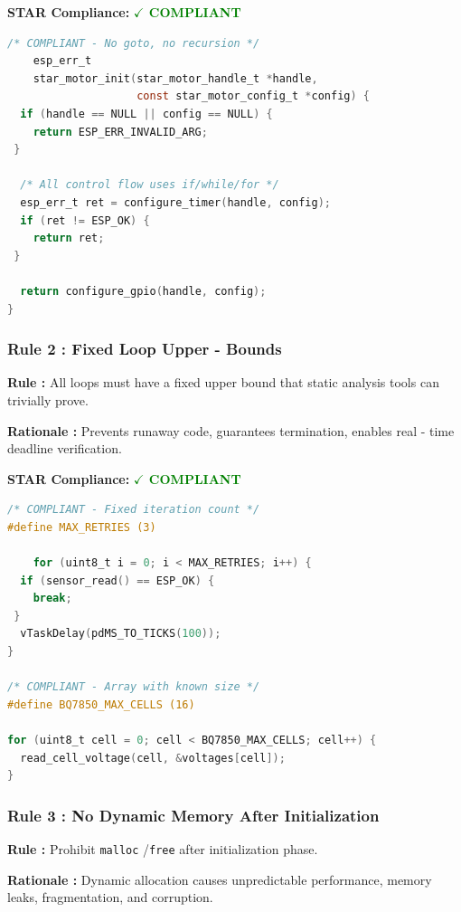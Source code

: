 \textbf{STAR Compliance:
}
\textcolor{green} {
  \textbf{$\checkmark$ COMPLIANT}
}

\begin{lstlisting}[language = C]
    /* COMPLIANT - No goto, no recursion */
    esp_err_t
    star_motor_init(star_motor_handle_t *handle,
                    const star_motor_config_t *config) {
  if (handle == NULL || config == NULL) {
    return ESP_ERR_INVALID_ARG;
 }

  /* All control flow uses if/while/for */
  esp_err_t ret = configure_timer(handle, config);
  if (ret != ESP_OK) {
    return ret;
 }

  return configure_gpio(handle, config);
}
\end{lstlisting}

\subsubsection{Rule 2 : Fixed Loop Upper - Bounds}

\textbf{Rule :} All loops must have a fixed upper bound
    that static analysis tools can trivially prove.

\textbf{Rationale :} Prevents runaway code,
    guarantees termination,
    enables real - time deadline verification.

\textbf{STAR Compliance:
}
\textcolor{green} {
  \textbf{$\checkmark$ COMPLIANT}
}

\begin{lstlisting}[language = C]
/* COMPLIANT - Fixed iteration count */
#define MAX_RETRIES (3)

    for (uint8_t i = 0; i < MAX_RETRIES; i++) {
  if (sensor_read() == ESP_OK) {
    break;
 }
  vTaskDelay(pdMS_TO_TICKS(100));
}

/* COMPLIANT - Array with known size */
#define BQ7850_MAX_CELLS (16)

for (uint8_t cell = 0; cell < BQ7850_MAX_CELLS; cell++) {
  read_cell_voltage(cell, &voltages[cell]);
}
\end{lstlisting}

\subsubsection{Rule 3 : No Dynamic Memory After Initialization}

\textbf{Rule :
} Prohibit \texttt{malloc} /\texttt{free} after initialization phase.

\textbf{Rationale :} Dynamic allocation causes unpredictable performance,
    memory leaks, fragmentation,
    and corruption.

